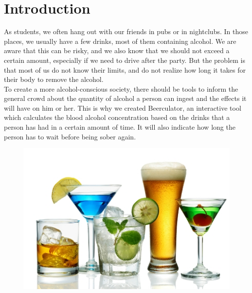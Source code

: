 \section{Introduction}
\label{sec:intro}

As students, we often hang out with our friends in pubs or in nightclubs. In those places, we usually have a few drinks, most of them containing alcohol. We are aware that this can be risky, and we also know that we should not exceed a certain amount, especially if we need to drive after the party. But the problem is that most of us do not know their limits, and do not realize how long it takes for their body to remove the alcohol. \\

To create a more alcohol-conscious society, there should be tools to inform the general crowd about the quantity of alcohol a person can ingest and the effects it will have on him or her. This is why we created Beerculator, an interactive tool which calculates the blood alcohol concentration based on the drinks that a person has had in a certain amount of time. It will also indicate how long the person has to wait before being sober again.

\vspace{20mm}

\begin{figure}[H]
	\centering
   \includegraphics{./figures/drinks.jpg}
\end{figure}
